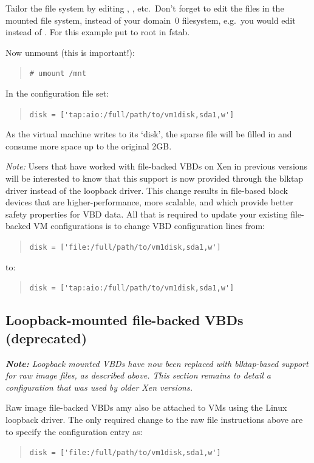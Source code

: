 \documentclass[11pt,twoside,final,openright]{report}
\begin{document}
Tailor the file system by editing ,
, etc.\ Don't forget to edit the files in the
mounted file system, instead of your domain~0 filesystem, e.g.\ you
would edit  instead of .  For
this example put  to root in fstab.

Now unmount (this is important!):
\begin{quote}
  \verb_# umount /mnt_
\end{quote}

In the configuration file set:
\begin{quote}
  \verb_disk = ['tap:aio:/full/path/to/vm1disk,sda1,w']_
\end{quote}

As the virtual machine writes to its `disk', the sparse file will be
filled in and consume more space up to the original 2GB.

{\em{Note:}} Users that have worked with file-backed VBDs on Xen in previous
versions will be interested to know that this support is now provided through
the blktap driver instead of the loopback driver.  This change results in
file-based block devices that are higher-performance, more scalable, and which
provide better safety properties for VBD data.  All that is required to update
your existing file-backed VM configurations is to change VBD configuration
lines from:
\begin{quote}
  \verb_disk = ['file:/full/path/to/vm1disk,sda1,w']_
\end{quote}
to:
\begin{quote}
  \verb_disk = ['tap:aio:/full/path/to/vm1disk,sda1,w']_
\end{quote}


\subsection{Loopback-mounted file-backed VBDs (deprecated)}

{\em{{\bf{Note:}} Loopback mounted VBDs have now been replaced with
    blktap-based support for raw image files, as described above.  This
    section remains to detail a configuration that was used by older Xen
    versions.}}

Raw image file-backed VBDs amy also be attached to VMs using the 
Linux loopback driver.  The only required change to the raw file 
instructions above are to specify the configuration entry as:
\begin{quote}
  \verb_disk = ['file:/full/path/to/vm1disk,sda1,w']_
\end{quote}
\end{document}
